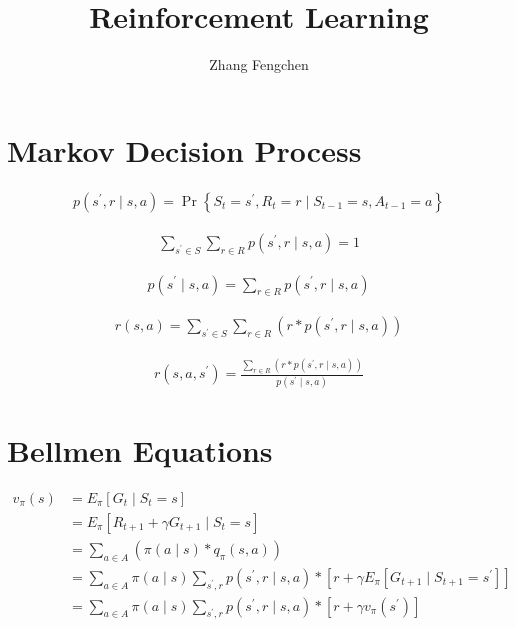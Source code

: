 \documentclass{article}
\begin{document}
\title{Reinforcement Learning}

\author{Zhang Fengchen}


\section{Markov Decision Process}

\begin{align*}
    p\left(s^{\prime}, r \mid s, a\right)
    =\operatorname{Pr}\left\{S_{t}=s^{\prime}, R_{t}=r \mid S_{t-1}=s, A_{t-1}=a\right\}
\end{align*}

\begin{align*}
    \sum_{s^{\prime} \in S} \sum_{r \in R} p\left(s^{\prime}, r \mid s, a\right)
    =1
\end{align*}

\begin{align*}
    p\left(s^{\prime} \mid s, a\right)
=\sum_{r \in R} p\left(s^{\prime}, r \mid s, a\right)
\end{align*}

\begin{align*}
    r(s, a)=\sum_{s^{\prime} \in S} \sum_{r \in R} \left(r * p\left(s^{\prime}, r \mid s, a\right)\right)
\end{align*}

\begin{align*}
    r\left(s, a, s^{\prime}\right)=
\frac{\sum_{r \in R} \left(r * p\left(s^{\prime}, r \mid s, a\right)\right)}
{p\left(s^{\prime} \mid s, a\right)}
\end{align*}



\newpage
\section{Bellmen Equations}

\begin{align*}
    v_{\pi}(s) &= E_{\pi} \left[G_{t} \mid S_{t}=s\right]\\
      &= E_{\pi} \left[R_{t+1}+\gamma G_{t+1} \mid S_{t}=s\right]\\
      &= \sum_{a \in A} \left(\pi(a \mid s) * q_{\pi}(s, a)\right) \\
      &= \sum_{a \in A} \pi(a \mid s) \sum_{s^{\prime}, r} p\left(s^{\prime}, r \mid s, a\right) * 
      \left[r+\gamma E_{\pi} \left[G_{t+1} \mid S_{t+1}=s^{\prime}\right]\right] \\
      &= \sum_{a \in A} \pi(a \mid s) \sum_{s^{\prime}, r} p\left(s^{\prime}, r \mid s, a\right) * 
      \left[r+\gamma v_{\pi}\left(s^{\prime}\right)\right]
\end{align*}
\end{document}
